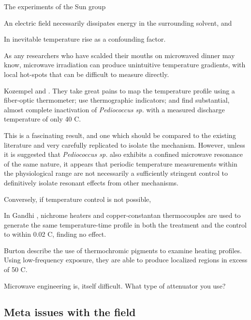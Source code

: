 \documentclass[paper.tex]{subfiles}
\begin{document}
The experiments of the Sun group 

An electric field necessarily dissipates energy in the surrounding solvent, and 

In inevitable temperature rise as a confounding factor. 

As any researchers who have scalded their mouths on microwaved dinner may know, microwave irradiation can produce unintuitive temperature gradients, with local hot-spots that can be difficult to measure directly.

Kozempel \cite{Preliminary1997} and \cite{Inactivationa}. They take great pains to map the temperature profile using a fiber-optic thermometer; use thermographic indicators; and find substantial, almost complete inactivation of {\it Pediococcus sp.} with a measured discharge temperature of only 40 C.

This is a fascinating result, and one which should be compared to the existing literature and very carefully replicated to isolate the mechanism. However, unless it is suggested that {\it Pediococcus sp.} also exhibits a confined microwave resonance of the same nature, it appears that periodic temperature measurements within the physiological range are not necessarily a sufficiently stringent control to definitively isolate resonant effects from other mechanisms.

Conversely, if temperature control is not possible, 

In Gandhi \cite{Basic1983}, nichrome heaters and copper-constantan thermocouples are used to generate the same temperature-time profile in both the treatment and the control to within 0.02 C, finding no effect. 

Burton\cite{Effects1950} describe the use of thermochromic pigments to examine heating profiles. Using low-frequency exposure, they are able to produce localized regions in excess of 50 C.




Microwave engineering is, itself  difficult. What type of attenuator you use?



\subsection{Meta issues with the field}

\end{document}
